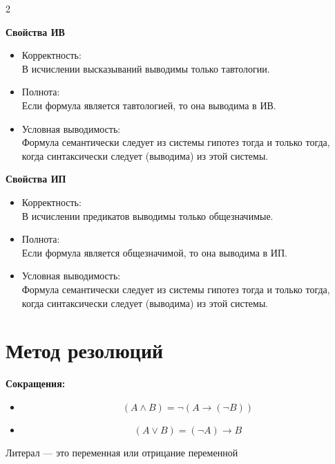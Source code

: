 \documentclass[11pt]{article}
\begin{document}
\begin{multicols}{2}
    \begin{center}
        \textbf{Свойства ИВ}
    \end{center}

    \begin{itemize}
        \item Корректность:\\ В исчислении высказываний выводимы только тавтологии.
        \item Полнота:\\ Если формула является тавтологией, то она выводима в ИВ.
        \item Условная выводимость:\\ Формула семантически следует из системы гипотез тогда и только тогда, когда синтаксически следует (выводима) из этой системы.
    \end{itemize}

    \begin{center}
        \textbf{Свойства ИП}
    \end{center}

    \begin{itemize}
        \item Корректность:\\ В исчислении предикатов выводимы только общезначимые.
        \item Полнота:\\ Если формула является общезначимой, то она выводима в ИП.
        \item Условная выводимость:\\ Формула семантически следует из системы гипотез тогда и только тогда, когда синтаксически следует (выводима) из этой системы.
    \end{itemize}
\end{multicols}

\section{Метод резолюций}

\textbf{Сокращения:}
\begin{itemize}
    \item \[(A \wedge B) = \lnot (A \to (\lnot B))\]
    \item \[(A \vee B) = (\lnot A) \to B\]
\end{itemize}

\begin{definition}
    Литерал --- это переменная или отрицание переменной
\end{definition}
\end{document}
